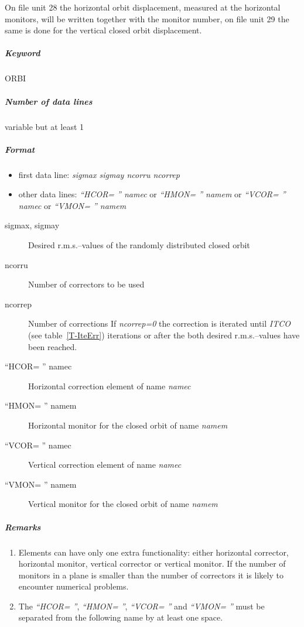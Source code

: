On file unit 28 the horizontal orbit displacement, measured at the
horizontal monitors, will be written together with the monitor number,
on file unit 29 the same is done for the vertical closed orbit
displacement. 

\subparagraph{Keyword} ORBI \subparagraph{Number of data lines}
variable but at least 1

\subparagraph{Format}
\begin{itemize}
\item first data line: {\em sigmax sigmay ncorru ncorrep}
\item other data lines: {\em ``HCOR= '' namec} \/or {\em ``HMON= ''
    namem} \newline or {\em ``VCOR= '' namec} \/or {\em ``VMON= ''
    namem}
\end{itemize}

\begin{description}
\item [sigmax, sigmay] Desired r.m.s.--values of the randomly distributed
  closed orbit
\item [ncorru] Number of correctors to be used
\item [ncorrep] Number of corrections \newline If {\em ncorrep=0}
  \/the correction is iterated until {\em ITCO} \/(see
  table~\ref{T-IteErr}) iterations or after the both desired
  r.m.s.--values have been reached.
\item [``HCOR= '' namec] Horizontal correction element of name {\em
    namec}
\item [``HMON= '' namem] Horizontal monitor for the closed orbit of
  name {\em namem}
\item [``VCOR= '' namec] Vertical correction element of name {\em
    namec}
\item [``VMON= '' namem] Vertical monitor for the closed orbit of name
  {\em namem}
\end{description}

\subparagraph{Remarks}
\begin{enumerate}
\item Elements can have only one extra functionality: either
  horizontal corrector, horizontal monitor, vertical corrector or
  vertical monitor. If the number of monitors in a plane is smaller
  than the number of correctors it is likely to encounter numerical
  problems.
\item The {\em ``HCOR= ''}\/, {\em ``HMON= ''}\/, {\em ``VCOR= ''}
  \/and {\em ``VMON= ''} \/must be separated from the following name
  by at least one space.
\end{enumerate}

